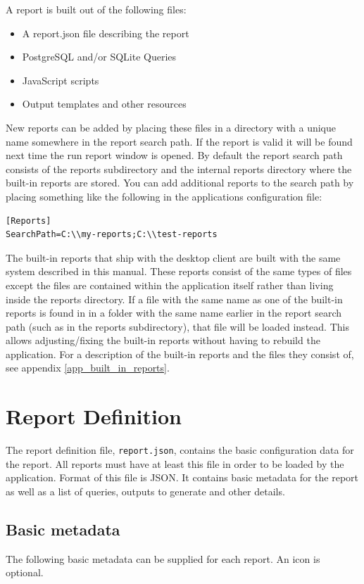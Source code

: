 \documentclass[a4paper,10pt]{book}
\begin{document}
A report is built out of the following files:
\begin{itemize}
\item A report.json file describing the report
\item PostgreSQL and/or SQLite Queries
\item JavaScript scripts
\item Output templates and other resources
\end{itemize}
New reports can be added by placing these files in a directory with a unique name somewhere in the report search path. If the report is valid it will be found next time the run report window is opened. By default the report search path consists of the reports subdirectory and the internal reports directory where the built-in reports are stored. You can add additional reports to the search path by placing something like the following in the applications configuration file:

\begin{verbatim}
[Reports]
SearchPath=C:\\my-reports;C:\\test-reports
\end{verbatim}

The built-in reports that ship with the desktop client are built with the same system described in this manual. These reports consist of the same types of files except the files are contained within the application itself rather than living inside the reports directory. If a file with the same name as one of the built-in reports is found in in a folder with the same name earlier in the report search path (such as in the reports subdirectory), that file will be loaded instead. This allows adjusting/fixing the built-in reports without having to rebuild the application. For a description of the built-in reports and the files they consist of, see appendix \ref{app_built_in_reports}.

\chapter{Report Definition}
The report definition file, \verb|report.json|, contains the basic configuration data for the report. All reports must have at least this file in order to be loaded by the application. Format of this file is JSON. It contains basic metadata for the report as well as a list of queries, outputs to generate and other details.

\section{Basic metadata}
The following basic metadata can be supplied for each report. An icon is optional.
\end{document}
